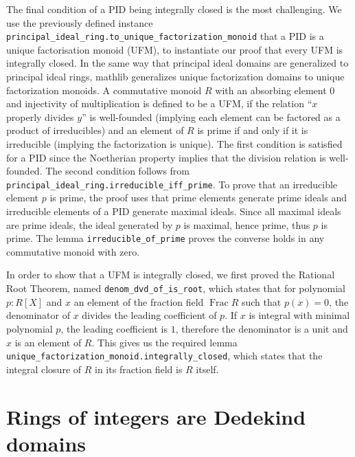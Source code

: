 \documentclass[a4paper,USenglish,cleveref, autoref, thm-restate]{lipics-v2021}
\newcommand{\lean}[1]{\texttt{#1}\xspace} %
\newcommand{\mathlib}{\textsf{mathlib}\xspace}
\DeclareMathOperator{\Frac}{Frac}
\begin{document}
The final condition of a PID being integrally closed is the most challenging.
We use the previously defined instance \lean{principal\_ideal\_ring.to\_unique\_factorization\_monoid} that a PID is a unique factorisation monoid (UFM),
to instantiate our proof that every UFM is integrally closed.
In the same way that principal ideal domains are generalized to principal ideal rings, \mathlib generalizes unique factorization domains to unique factorization monoids.
A commutative monoid $R$ with an absorbing element $0$ and injectivity of multiplication is defined to be a UFM,
if the relation ``$x$ properly divides $y$'' is well-founded (implying each element can be factored as a product of irreducibles) and
an element of $R$ is prime if and only if it is irreducible (implying the factorization is unique).
The first condition is satisfied for a PID since the Noetherian property implies that the division relation is well-founded.
The second condition follows from \lean{principal\_ideal\_ring.irreducible\_iff\_prime}.
To prove that an irreducible element $p$ is prime, the proof uses that prime elements generate prime ideals and irreducible elements of a PID generate maximal ideals. Since all maximal ideals are prime ideals, the ideal generated by $p$ is maximal, hence prime, thus $p$ is prime.
The lemma \lean{irreducible\_of\_prime} proves the converse holds in any commutative monoid with zero.

In order to show that a UFM is integrally closed, we first proved the Rational Root Theorem, named \lean{denom\_dvd\_of\_is\_root},
which states that for polynomial $p : R[X]$ and $x$ an element of the fraction field $\Frac R$ such that $p(x) = 0$, the denominator of $x$ divides the leading coefficient of $p$.
If $x$ is integral with minimal polynomial $p$, the leading coefficient is $1$, therefore the denominator is a unit and $x$ is an element of $R$.
This gives us the required lemma \lean{unique\_factorization\_monoid.integrally\_closed}, which states that the integral closure of $R$ in its fraction field is $R$ itself.

\section{Rings of integers are Dedekind domains} \label{sec:integral-closure}

\end{document}
